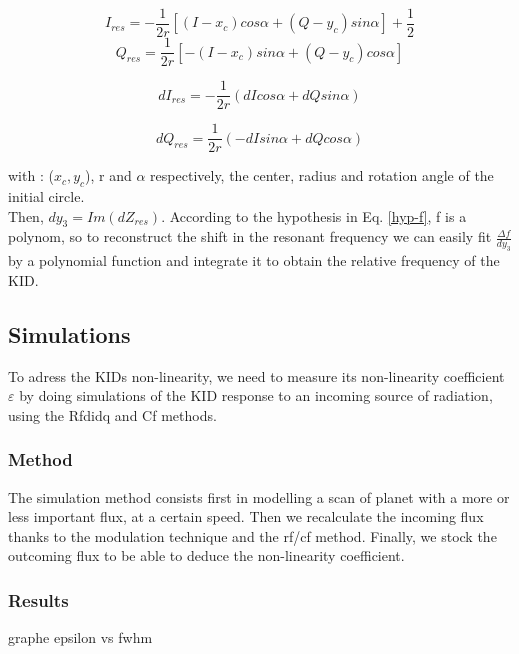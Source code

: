 \begin{equation}
I_{res} = - \frac{1}{2r}[(I-x_{c})cos\alpha + (Q - y_{c})sin \alpha] + \frac{1}{2}
\end{equation}
\begin{equation}
 Q_{res} = \frac{1}{2r}[-(I-x_{c})sin\alpha + (Q - y_{c})cos \alpha] 
\end{equation}

\begin{equation}
dI_{res} = -\frac{1}{2r}(dI cos\alpha + dQ sin\alpha)
\end{equation}

\begin{equation}
dQ_{res} = \frac{1}{2r}(-dI sin\alpha + dQ cos\alpha)
\end{equation}

with : ($x_{c}, y_{c}$), r and $\alpha$ respectively, the center, radius and rotation angle of the initial circle.\\
Then, $dy_{3} = Im(dZ_{res})$. According to the hypothesis in Eq. \ref{hyp-f}, f is a polynom, so to reconstruct the shift in the resonant frequency we can easily fit $\frac{\Delta f}{dy_{3}}$ by a polynomial function and integrate it to obtain the relative frequency of the KID.


\subsection{Simulations}
To adress the KIDs non-linearity, we need to measure its non-linearity coefficient $\varepsilon$ by doing simulations of the KID response to an incoming source of radiation, using the Rfdidq and Cf methods.

	\subsubsection{Method}
The simulation method consists first in modelling a scan of planet with a more or less important flux, at a certain speed. Then we recalculate the incoming flux thanks to the modulation technique and the rf/cf method. Finally, we stock the outcoming flux to be able to deduce the non-linearity coefficient.

	\subsubsection{Results}
graphe epsilon vs fwhm